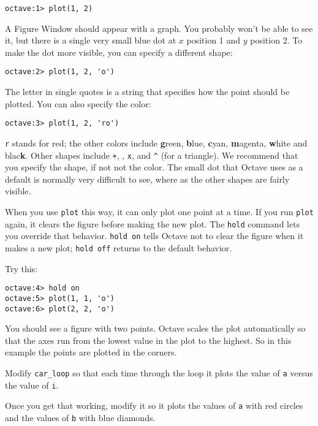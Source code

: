 \begin{verbatim}
octave:1> plot(1, 2)
\end{verbatim}

A {\sf Figure Window} should appear with a graph. You probably won't be able to
see it, but there is a single very small blue dot
at $x$ position 1 and $y$ position 2. To make the dot more visible,
you can specify a different shape:

\begin{verbatim}
octave:2> plot(1, 2, 'o')
\end{verbatim}

The letter in single quotes is a string that specifies how the
point should be plotted. You can also specify the color:

\begin{verbatim}
octave:3> plot(1, 2, 'ro')
\end{verbatim}

{\tt r} stands for red; the other colors include {\bf g}reen, {\bf
b}lue, {\bf c}yan, {\bf m}agenta, {\bf w}hite and blac{\bf k}.
Other shapes include {\tt +}, 
{\tt *}, 
{\tt x}, and 
\verb+^+ (for a triangle). 
We recommend that you specify the shape, if not not the color. The small dot
that Octave uses as a default is normally very difficult to see, where as the
other shapes are fairly visible.

When you use {\tt plot} this way, it can only plot one point at a
time. If you run {\tt plot} again, it clears the figure before making
the new plot. The {\tt hold} command lets you override that behavior.
{\tt hold on} tells Octave not to clear the figure when it makes a new
plot; {\tt hold off} returns to the default behavior.

Try this:

\begin{verbatim}
octave:4> hold on
octave:5> plot(1, 1, 'o')
octave:6> plot(2, 2, 'o')
\end{verbatim}

You should see a figure with two points. Octave scales
the plot automatically so that the axes run from the lowest value in
the plot to the highest. So in this example the points are plotted in
the corners.

\begin{ex}
Modify {\tt car\_loop} so that each time through the
loop it plots the value of {\tt a} versus the value of {\tt i}.

Once you get that working, modify it so it plots the values of {\tt a}
with red circles and the values of {\tt b} with blue diamonds.

\end{ex}

